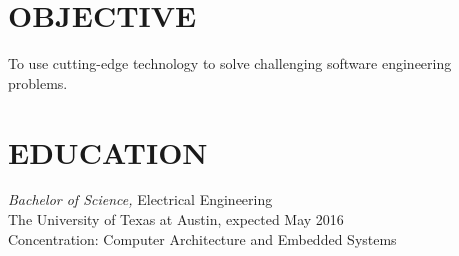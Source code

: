 \documentclass[margin]{res}
\begin{document}
\vspace{-3.5em}
\address{301 W 39th St., Apt 202\\
  Austin, TX 78751}
\address{\href{mailto:hershal.bhave@gmail.com}{\ul{\texttt{hershal.bhave@gmail.com}}} \\
  \href{https://github.com/hershal}{\ul{\texttt{github.com/hershal}}}}
\begin{resume}
  \section{OBJECTIVE}
  To use cutting-edge technology to solve challenging software engineering
  problems.
  \section{EDUCATION}
  {\sl Bachelor of Science,} Electrical Engineering \\
  The University of Texas at Austin, expected May 2016 \\
  Concentration: Computer Architecture and Embedded Systems

\end{resume}
\end{document}
